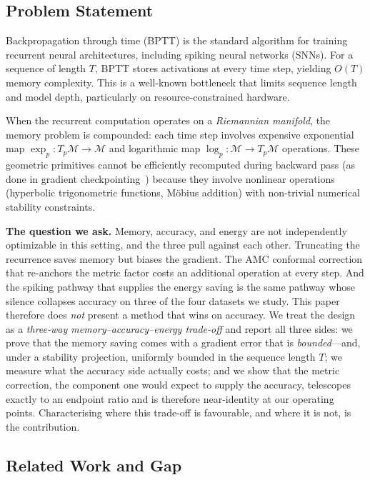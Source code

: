 \documentclass[a4paper,fleqn]{cas-dc}
\begin{document}
\subsection{Problem Statement}

Backpropagation through time (BPTT) is the standard algorithm for training recurrent neural architectures, including spiking neural networks (SNNs). For a sequence of length $T$, BPTT stores activations at every time step, yielding $O(T)$ memory complexity. This is a well-known bottleneck that limits sequence length and model depth, particularly on resource-constrained hardware.

When the recurrent computation operates on a \textit{Riemannian manifold}, the memory problem is compounded: each time step involves expensive exponential map $\exp_p: T_p\mathcal{M} \to \mathcal{M}$ and logarithmic map $\log_p: \mathcal{M} \to T_p\mathcal{M}$ operations. These geometric primitives cannot be efficiently recomputed during backward pass (as done in gradient checkpointing~\citep{Chen16Checkpoint}) because they involve nonlinear operations (hyperbolic trigonometric functions, M\"obius addition) with non-trivial numerical stability constraints.

\textbf{The question we ask.} Memory, accuracy, and energy are not independently optimizable in this setting, and the three pull against each other. Truncating the recurrence saves memory but biases the gradient. The AMC conformal correction that re-anchors the metric factor costs an additional operation at every step. And the spiking pathway that supplies the energy saving is the same pathway whose silence collapses accuracy on three of the four datasets we study. This paper therefore does \emph{not} present a method that wins on accuracy. We treat the design as a \emph{three-way memory--accuracy--energy trade-off} and report all three sides: we prove that the memory saving comes with a gradient error that is \emph{bounded}---and, under a stability projection, uniformly bounded in the sequence length $T$; we measure what the accuracy side actually costs; and we show that the metric correction, the component one would expect to supply the accuracy, telescopes exactly to an endpoint ratio and is therefore near-identity at our operating points. Characterising where this trade-off is favourable, and where it is not, is the contribution.

\subsection{Related Work and Gap}
\end{document}
